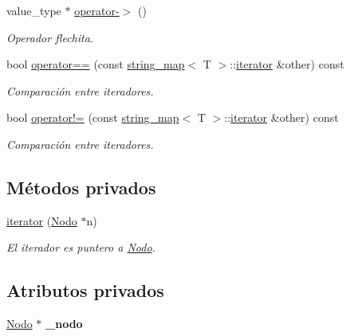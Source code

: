 \begin{DoxyCompactItemize}
\item 
value\-\_\-type $\ast$ \hyperlink{classstring__map_1_1iterator_a4fabcd1bf327adeff53dc52ccc0a8229}{operator-\/$>$} ()
\begin{DoxyCompactList}\small\item\em Operador flechita. \end{DoxyCompactList}\item 
bool \hyperlink{classstring__map_1_1iterator_ae925a84681f01ac54a40868a592486d1}{operator==} (const \hyperlink{classstring__map}{string\-\_\-map}$<$ T $>$\-::\hyperlink{classstring__map_1_1iterator}{iterator} \&other) const 
\begin{DoxyCompactList}\small\item\em Comparación entre iteradores. \end{DoxyCompactList}\item 
bool \hyperlink{classstring__map_1_1iterator_a6b5de52586495286a8c211759667387c}{operator!=} (const \hyperlink{classstring__map}{string\-\_\-map}$<$ T $>$\-::\hyperlink{classstring__map_1_1iterator}{iterator} \&other) const 
\begin{DoxyCompactList}\small\item\em Comparación entre iteradores. \end{DoxyCompactList}\end{DoxyCompactItemize}
\subsection*{Métodos privados}
\begin{DoxyCompactItemize}
\item 
\hypertarget{classstring__map_1_1iterator_a9adc687055baa860aaddb8f2f955ae1a}{\hyperlink{classstring__map_1_1iterator_a9adc687055baa860aaddb8f2f955ae1a}{iterator} (\hyperlink{structstring__map_1_1Nodo}{Nodo} $\ast$n)}\label{classstring__map_1_1iterator_a9adc687055baa860aaddb8f2f955ae1a}

\begin{DoxyCompactList}\small\item\em El iterador es puntero a \hyperlink{structstring__map_1_1Nodo}{Nodo}. \end{DoxyCompactList}\end{DoxyCompactItemize}
\subsection*{Atributos privados}
\begin{DoxyCompactItemize}
\item 
\hypertarget{classstring__map_1_1iterator_aa1f7fdb1686ce1b763c002490fc83c51}{\hyperlink{structstring__map_1_1Nodo}{Nodo} $\ast$ {\bfseries \-\_\-nodo}}\label{classstring__map_1_1iterator_aa1f7fdb1686ce1b763c002490fc83c51}

\end{DoxyCompactItemize}
